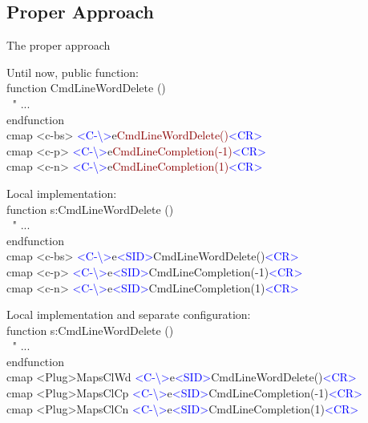 \documentclass{beamer}
\newenvironment{mycode}[0]
{\ttfamily}
{}
\newcommand{\myind}[1]{\textcolor{white}{#1}}
\newcommand{\mycommt}[1]{\textcolor{comment}{#1}}
\newcommand{\mykeywd}[1]{\textcolor{keyword}{#1}}
\newcommand{\myctrlkey}[1]{\textcolor{blue}{#1}}
\begin{document}
\subsection{Proper Approach}

\begin{frame}{The proper approach}{}

	\begin{overprint}

		Until now, public function: \\

		\begin{mycode}
			\mykeywd{function} CmdLineWordDelete () \\
			\myind{..}\mycommt{" ...} \\
			\mykeywd{endfunction} \\[2mm]
%
			cmap  <c-bs>   \myctrlkey{<C-\textbackslash>}e\textcolor{darkred}{CmdLineWordDelete()}\myctrlkey{<CR>} \\
			cmap  <c-p> {} \myctrlkey{<C-\textbackslash>}e\textcolor{darkred}{CmdLineCompletion(-1)}\myctrlkey{<CR>} \\
			cmap  <c-n> {} \myctrlkey{<C-\textbackslash>}e\textcolor{darkred}{CmdLineCompletion(1)}\myctrlkey{<CR>}
		\end{mycode}


		Local implementation: \\

		\begin{mycode}
			\mykeywd{function} s:CmdLineWordDelete () \\
			\myind{..}\mycommt{" ...} \\
			\mykeywd{endfunction} \\[2mm]
%
			cmap  <c-bs>   \myctrlkey{<C-\textbackslash>}e\myctrlkey{<SID>}CmdLineWordDelete()\myctrlkey{<CR>} \\
			cmap  <c-p> {} \myctrlkey{<C-\textbackslash>}e\myctrlkey{<SID>}CmdLineCompletion(-1)\myctrlkey{<CR>} \\
			cmap  <c-n> {} \myctrlkey{<C-\textbackslash>}e\myctrlkey{<SID>}CmdLineCompletion(1)\myctrlkey{<CR>}
		\end{mycode}


		Local implementation and separate configuration: \\

		\begin{mycode}
			\mykeywd{function} s:CmdLineWordDelete () \\
			\myind{..}\mycommt{" ...} \\
			\mykeywd{endfunction} \\[2mm]
%
			cmap  <Plug>MapsClWd   \myctrlkey{<C-\textbackslash>}e\myctrlkey{<SID>}CmdLineWordDelete()\myctrlkey{<CR>} \\
			cmap  <Plug>MapsClCp   \myctrlkey{<C-\textbackslash>}e\myctrlkey{<SID>}CmdLineCompletion(-1)\myctrlkey{<CR>} \\
			cmap  <Plug>MapsClCn   \myctrlkey{<C-\textbackslash>}e\myctrlkey{<SID>}CmdLineCompletion(1)\myctrlkey{<CR>}
		\end{mycode}


\end{overprint}
\end{frame}
\end{document}
